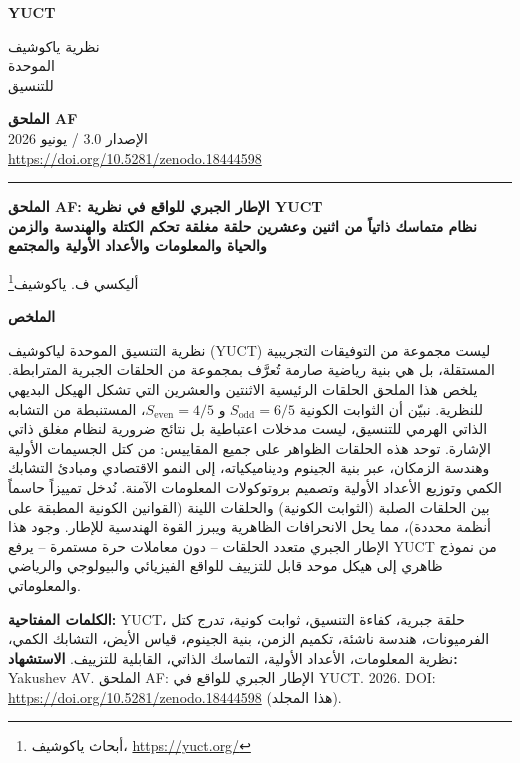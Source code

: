\documentclass[12pt,a4paper]{article}
\newcommand{\makeheader}{%
	\noindent
	\begin{minipage}{0.17\textwidth}
		\raggedright
		{\sffamily\bfseries\color{skyblue}\fontsize{40}{40}\selectfont YUCT}%
	\end{minipage}%
	\hspace{30pt}
	\begin{minipage}{0.32\textwidth}
		\raggedright
		{\sffamily\fontsize{11}{13}\selectfont نظرية ياكوشيف\\ الموحدة\\ للتنسيق}%
	\end{minipage}%
	\hfill
	\begin{minipage}{0.38\textwidth}
		\raggedleft
		{\sffamily\bfseries الملحق AF}\\ %
		{\sffamily الإصدار 3.0 / يونيو 2026}\\ %
		{\sffamily\footnotesize \url{https://doi.org/10.5281/zenodo.18444598}}%
	\end{minipage}
	\par\vspace{5pt}
	\noindent\textcolor{gold}{\rule{\textwidth}{1.6pt}}
	\par\vspace{0pt}
}
\begin{document}
	\thispagestyle{firstpage}
	\makeheader
	
	\vspace{0cm}
	{\LARGE\bfseries الملحق AF: الإطار الجبري للواقع في نظرية YUCT \\ 
		\Large نظام متماسك ذاتياً من اثنين وعشرين حلقة مغلقة تحكم الكتلة والهندسة والزمن والحياة والمعلومات والأعداد الأولية والمجتمع \par}
	\vspace{0.2cm}
	
	{\large أليكسي ف. ياكوشيف\footnote{أبحاث ياكوشيف، \url{https://yuct.org/}}} \\
	\vspace{0.0cm}
	
	{\color{darkblue}\textbf{\LARGE الملخص}} \par
	{\large
		\noindent
		نظرية التنسيق الموحدة لياكوشيف (YUCT) ليست مجموعة من التوفيقات التجريبية المستقلة، بل هي بنية رياضية صارمة تُعرَّف بمجموعة من الحلقات الجبرية المترابطة. يلخص هذا الملحق الحلقات الرئيسية الاثنتين والعشرين التي تشكل الهيكل البديهي للنظرية. نبيّن أن الثوابت الكونية \(S_{\mathrm{odd}}=6/5\) و \(S_{\mathrm{even}}=4/5\)، المستنبطة من التشابه الذاتي الهرمي للتنسيق، ليست مدخلات اعتباطية بل نتائج ضرورية لنظام مغلق ذاتي الإشارة. توحد هذه الحلقات الظواهر على جميع المقاييس: من كتل الجسيمات الأولية وهندسة الزمكان، عبر بنية الجينوم وديناميكياته، إلى النمو الاقتصادي ومبادئ التشابك الكمي وتوزيع الأعداد الأولية وتصميم بروتوكولات المعلومات الآمنة. نُدخل تمييزاً حاسماً بين الحلقات الصلبة (الثوابت الكونية) والحلقات اللينة (القوانين الكونية المطبقة على أنظمة محددة)، مما يحل الانحرافات الظاهرية ويبرز القوة الهندسية للإطار. وجود هذا الإطار الجبري متعدد الحلقات – دون معاملات حرة مستمرة – يرفع YUCT من نموذج ظاهري إلى هيكل موحد قابل للتزييف للواقع الفيزيائي والبيولوجي والرياضي والمعلوماتي.}
	
	\vspace{0.1cm}
	\noindent
	{\color{darkblue}\textbf{الكلمات المفتاحية:}} YUCT، حلقة جبرية، كفاءة التنسيق، ثوابت كونية، تدرج كتل الفرميونات، هندسة ناشئة، تكميم الزمن، بنية الجينوم، قياس الأيض، التشابك الكمي، نظرية المعلومات، الأعداد الأولية، التماسك الذاتي، القابلية للتزييف.
	\vspace{0.1cm}
	\noindent
	{\color{darkblue}\textbf{الاستشهاد:}} Yakushev AV. الملحق AF: الإطار الجبري للواقع في YUCT. 2026. DOI: \url{https://doi.org/10.5281/zenodo.18444598} (هذا المجلد).
	
	\vspace{0.4cm}
	
\end{document}
